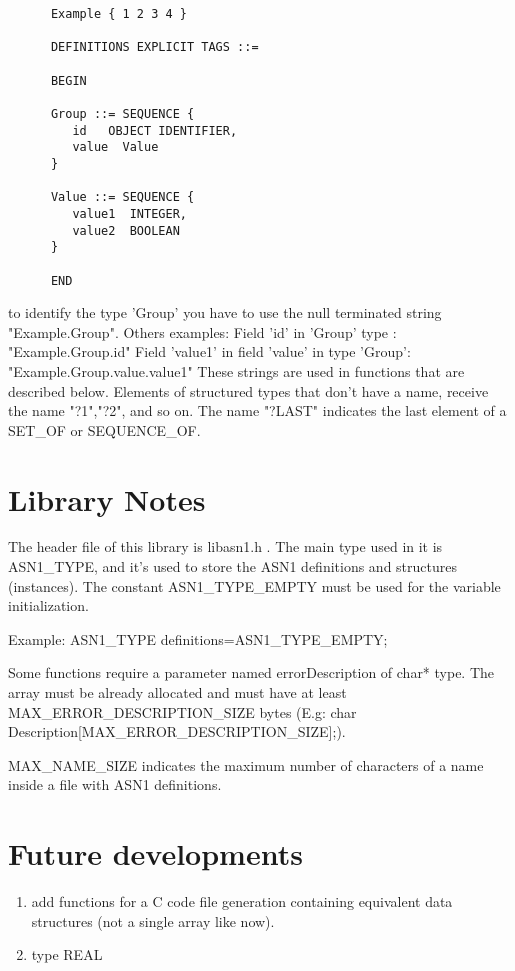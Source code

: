 \documentclass{book}
\begin{document}
\begin{verbatim}
      Example { 1 2 3 4 }

      DEFINITIONS EXPLICIT TAGS ::=

      BEGIN 

      Group ::= SEQUENCE {
         id   OBJECT IDENTIFIER,
         value  Value
      }

      Value ::= SEQUENCE {
         value1  INTEGER,
         value2  BOOLEAN 
      }

      END
\end{verbatim}

to identify the type 'Group' you have to use the null terminated string "Example.Group".
Others examples:
Field 'id' in 'Group' type :  "Example.Group.id"
Field 'value1' in field 'value' in type 'Group':   "Example.Group.value.value1" 
These strings are used in functions that are described below.
Elements of structured types that don't have a name, receive the name "?1","?2", and so on. 
The name "?LAST" indicates the last element of a SET\_OF or SEQUENCE\_OF.

\section{Library Notes}
The header file of this library is libasn1.h .
The main type used in it is ASN1\_TYPE, and it's used to
store the ASN1 definitions and structures (instances).
The constant ASN1\_TYPE\_EMPTY must be used for the variable initialization.
\par
Example:  ASN1\_TYPE  definitions=ASN1\_TYPE\_EMPTY;
\par 
Some functions require a parameter named errorDescription of char* type.
The array must be already allocated and must have at least
MAX\_ERROR\_DESCRIPTION\_SIZE bytes
(E.g: char Description[MAX\_ERROR\_DESCRIPTION\_SIZE];). 
\par
MAX\_NAME\_SIZE indicates the maximum number of characters of a name inside
a file with ASN1 definitions. 

\section{Future developments}
\begin{enumerate}
\item add functions for a C code file generation containing equivalent 
data structures (not a single array like now).
\item type REAL 
\end{enumerate}
\end{document}
